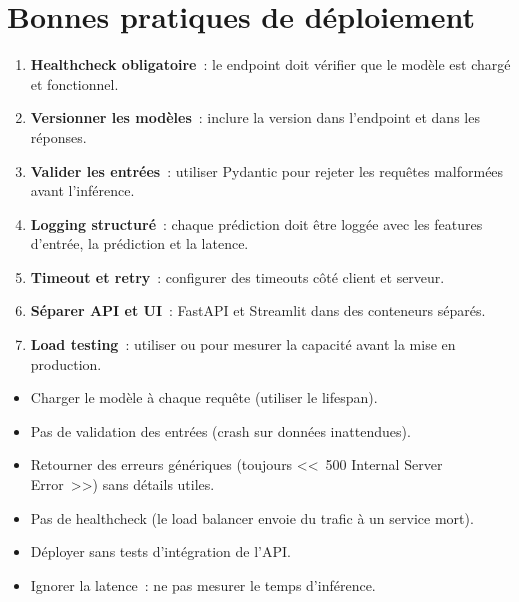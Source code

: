 \section{Bonnes pratiques de d\'eploiement}
\label{sec:deploy-best-practices}

\begin{bonnepratique}[title=\textbf{R\`egles d'or du d\'eploiement ML}]
\begin{enumerate}
  \item \textbf{Healthcheck obligatoire}~: le endpoint  doit
    v\'erifier que le mod\`ele est charg\'e et fonctionnel.
  \item \textbf{Versionner les mod\`eles}~: inclure la version dans
    l'endpoint  et dans les r\'eponses.
  \item \textbf{Valider les entr\'ees}~: utiliser Pydantic pour rejeter
    les requ\^etes malform\'ees avant l'inf\'erence.
  \item \textbf{Logging structur\'e}~: chaque pr\'ediction doit \^etre
    logg\'ee avec les features d'entr\'ee, la pr\'ediction et la latence.
  \item \textbf{Timeout et retry}~: configurer des timeouts c\^ot\'e
    client et serveur.
  \item \textbf{S\'eparer API et UI}~: FastAPI et Streamlit dans des
    conteneurs s\'epar\'es.
  \item \textbf{Load testing}~: utiliser  ou  pour
    mesurer la capacit\'e avant la mise en production.
\end{enumerate}
\end{bonnepratique}

\begin{antipattern}[title=\textbf{Anti-patterns de d\'eploiement}]
\begin{itemize}
  \item Charger le mod\`ele \`a chaque requ\^ete (utiliser le lifespan).
  \item Pas de validation des entr\'ees (crash sur donn\'ees inattendues).
  \item Retourner des erreurs g\'en\'eriques (toujours <<~500 Internal Server
    Error~>>) sans d\'etails utiles.
  \item Pas de healthcheck (le load balancer envoie du trafic \`a un service
    mort).
  \item D\'eployer sans tests d'int\'egration de l'API.
  \item Ignorer la latence~: ne pas mesurer le temps d'inf\'erence.
\end{itemize}
\end{antipattern}

